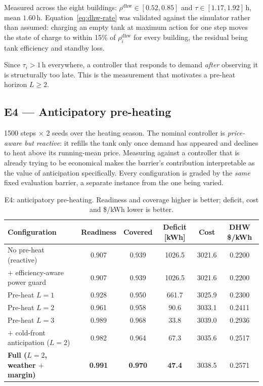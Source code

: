 \documentclass[11pt]{article}
\begin{document}
Measured across the eight buildings: $\rho^{\text{dhw}} \in [0.52, 0.85]$ and
$\tau \in [1.17, 1.92]$\,h, mean $1.60$\,h. Equation~\ref{eq:dhw-rate} was
validated against the simulator rather than assumed: charging an empty tank at
maximum action for one step moves the state of charge to within 15\% of
$\rho^{\text{dhw}}_i$ for every building, the residual being tank efficiency and
standby loss.

Since $\tau_i > 1$\,h everywhere, a controller that responds to demand
\emph{after} observing it is structurally too late. This is the measurement that
motivates a pre-heat horizon $L \ge 2$.

\subsection{E4 --- Anticipatory pre-heating}
\label{sec:exp-dhw}

1500 steps $\times$ 2 seeds over the heating season. The nominal controller is
\emph{price-aware but reactive}: it refills the tank only once demand has
appeared and declines to heat above its running-mean price. Measuring against a
controller that is already trying to be economical makes the barrier's
contribution interpretable as the value of anticipation specifically. Every
configuration is graded by the \emph{same} fixed evaluation barrier, a separate
instance from the one being varied.

\begin{table}[h]
\centering
\caption{E4: anticipatory pre-heating. Readiness and coverage higher is better;
deficit, cost and \$/kWh lower is better.}
\label{tab:preheat}
\small
\begin{tabular}{lccccc}
\toprule
Configuration & Readiness & Covered & Deficit [kWh] & Cost & DHW \$/kWh \\
\midrule
No pre-heat (reactive) & 0.907 & 0.939 & 1026.5 & 3021.6 & 0.2200 \\
\quad $+$ efficiency-aware power guard & 0.907 & 0.939 & 1026.5 & 3021.6 & 0.2200 \\
Pre-heat $L=1$ & 0.928 & 0.950 & 661.7 & 3025.9 & 0.2300 \\
Pre-heat $L=2$ & 0.961 & 0.958 & 90.6 & 3033.1 & 0.2411 \\
Pre-heat $L=3$ & 0.989 & 0.968 & 33.8 & 3039.0 & 0.2936 \\
\quad $+$ cold-front anticipation ($L=2$) & 0.982 & 0.964 & 67.3 & 3035.6 & 0.2517 \\
\textbf{Full ($L=2$, weather $+$ margin)} & \textbf{0.991} & \textbf{0.970} & \textbf{47.4} & 3038.5 & 0.2571 \\
\bottomrule
\end{tabular}
\end{table}
\end{document}
